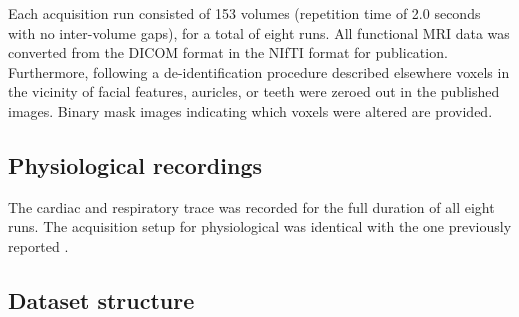 Each acquisition run consisted of 153 volumes (repetition time of 2.0 seconds
with no inter-volume gaps), for a total of eight runs. All functional MRI data
was converted from the DICOM format in the NIfTI format for publication.
Furthermore, following a de-identification procedure described elsewhere
\cite{Hanke_2014} voxels in the vicinity of facial features, auricles, or teeth
were zeroed out in the published images. Binary mask images indicating which
voxels were altered are provided.

\subsection*{Physiological recordings}

The cardiac and respiratory trace was recorded for the full duration of all
eight runs. The acquisition setup for physiological was identical with the one
previously reported \cite{Hanke_2014}.

\subsection*{Dataset structure}


